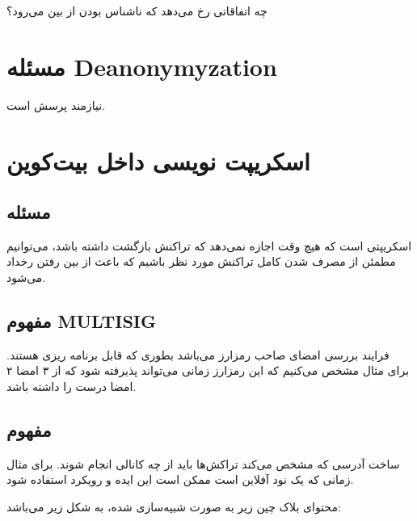 \documentclass[10pt, a4paper]{article}
\begin{document}
چه اتفاقاتی رخ می‌دهد که ناشناس بودن از بین می‌رود؟

\section{مسئله Deanonymyzation}

نیازمند پرسش است.

\section{اسکریپت نویسی داخل بیت‌کوین}

\subsection{مسئله }

اسکریپتی است که هیچ وقت اجازه نمی‌دهد که تراکنش بازگشت داشته باشد، می‌توانیم
مطمئن از مصرف شدن کامل تراکنش مورد نظر باشیم که باعث از بین رفتن رخداد
 می‌شود.

\subsection{مفهوم MULTISIG}

فرایند بررسی امضای صاحب رمزارز می‌باشد بطوری که قابل برنامه ریزی هستند. برای
مثال مشخص می‌کنیم که این رمزارز زمانی می‌تواند پذیرفته شود که از ۳ امضا ۲ امضا
درست را داشته باشد.

\subsection{مفهوم }

ساخت آدرسی که مشخص می‌کند تراکش‌ها باید از چه کانالی انجام شوند. برای مثال زمانی
که یک نود آفلاین است ممکن است این ایده و رویکرد استفاده شود.

محتوای بلاک چین زیر به صورت شبیه‌سازی شده، به شکل زیر می‌باشد:
\end{document}
